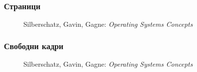 \documentclass[ignorenonframetext, hyperref=unicode]{beamer}
\begin{document}
\begin{frame}
\frametitle{Страници}
\begin{figure}[h]
\center
{}
\caption{Silberschatz, Gavin, Gagne: {\em Operating Systems Concepts}}
\end{figure}
\end{frame}

\begin{frame}
\frametitle{Свободни кадри}
\begin{figure}[h]
\center
{}
\caption{Silberschatz, Gavin, Gagne: {\em Operating Systems Concepts}}
\end{figure}
\end{frame}
\end{document}
